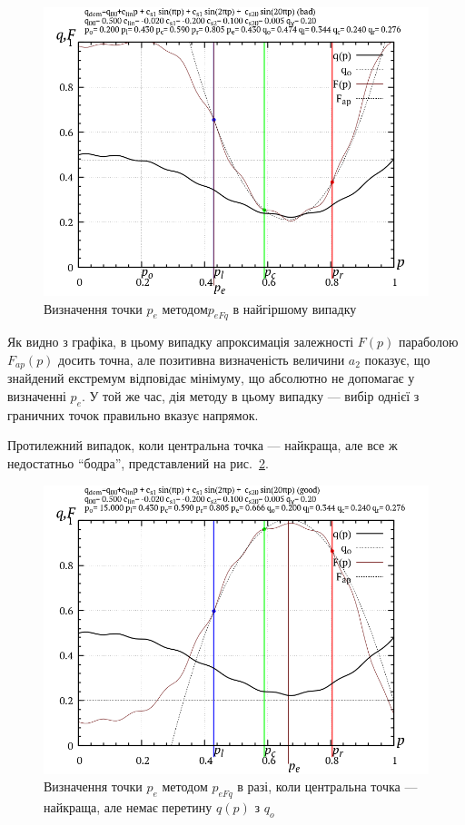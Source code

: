 \begin{figure}[htb!]
  \begin{center}
    \includegraphics[width=60\TW]{p/p_eFq/q_p_eFq_bad.png}
  \end{center}
  \caption{Визначення точки $ p_e $ методом$ p_{eFq} $ в найгіршому випадку}
  \label{atu:f:p_eFq_bad}
\end{figure}

Як видно з графіка, в цьому випадку апроксимація залежності
$ F (p) $ параболою
$ F_{ap} (p) $ досить точна, але позитивна визначеність величини
$ a_2 $ показує, що знайдений екстремум відповідає мінімуму, що
абсолютно не допомагає у визначенні
$ p_e $. У той же час, дія методу в цьому випадку --- вибір однієї з
граничних точок правильно вказує напрямок.

Протилежний випадок, коли центральна точка --- найкраща, але все
ж недостатньо ``бодра'', представлений на рис.~\ref{atu:f:p_eFq_good}.

\begin{figure}[htb!]
  \begin{center}
    \includegraphics[width=60\TW]{p/p_eFq/q_p_eFq_good.png}
  \end{center}
  \caption{Визначення точки $ p_e $ методом $ p_{eFq} $ в разі, коли центральна точка --- найкраща, але немає перетину $q(p)$ з $ q_o $}
  \label{atu:f:p_eFq_good}
\end{figure}

